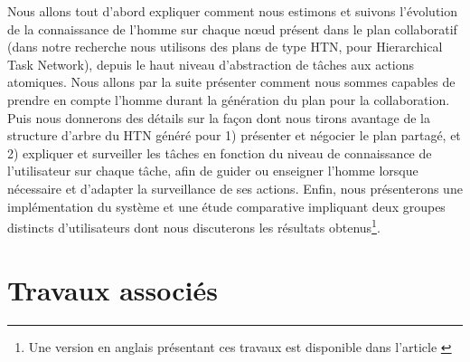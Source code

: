 \documentclass[a4paper,11pt,twoside]{StyleThese}
\begin{document}
Nous allons tout d'abord expliquer comment nous estimons et suivons l'évolution de la connaissance de l'homme sur chaque nœud présent dans le plan collaboratif (dans notre recherche nous utilisons des plans de type HTN, pour Hierarchical Task Network), depuis le haut niveau d'abstraction de tâches aux actions atomiques. Nous allons par la suite présenter comment nous sommes capables de prendre en compte l'homme durant la génération du plan pour la collaboration. Puis nous donnerons des détails sur la façon dont nous tirons avantage de la structure d'arbre du HTN généré pour 1) présenter et négocier le plan partagé,
et 2) expliquer et surveiller les tâches en fonction du niveau de connaissance de l'utilisateur sur chaque tâche, afin de guider ou enseigner l'homme lorsque nécessaire et d'adapter la surveillance de ses actions. Enfin, nous présenterons une implémentation du système et une étude comparative impliquant deux groupes distincts d'utilisateurs dont nous discuterons les résultats obtenus\footnote{Une version en anglais présentant ces travaux est disponible dans l'article \cite{Milliez16}}.





\section{Travaux associés}



\end{document}
